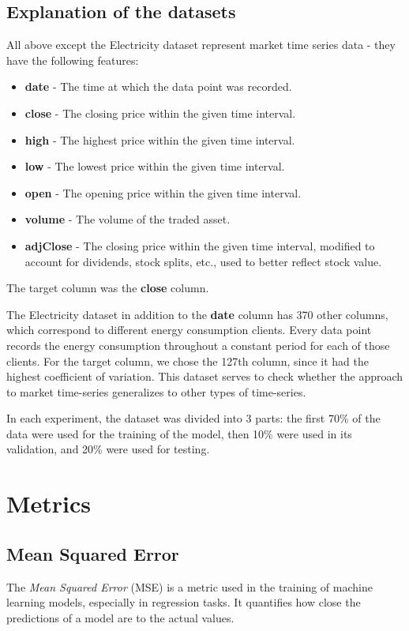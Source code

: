 \subsection{Explanation of the datasets}
All above except the Electricity dataset represent market time series data - they have the following features:
\begin{itemize}
	\item \textbf{date} - The time at which the data point was recorded.
	\item \textbf{close} - The closing price within the given time interval.
	\item \textbf{high} - The highest price within the given time interval.
	\item \textbf{low} - The lowest price within the given time interval.
	\item \textbf{open} - The opening price within the given time interval.
	\item \textbf{volume} - The volume of the traded asset.
	\item \textbf{adjClose} - The closing price within the given time interval, modified to account for dividends, stock splits, etc., used to better reflect stock value.
\end{itemize}
The target column was the \textbf{close} column.

The Electricity dataset in addition to the \textbf{date} column has 370 other columns, which correspond to different energy consumption clients. Every data point records the energy consumption throughout a constant period for each of those clients. For the target column, we chose the 127th column, since it had the highest coefficient of variation.
This dataset serves to check whether the approach to market time-series generalizes to other types of time-series.

In each experiment, the dataset was divided into 3 parts: the first 70\% of the data were used for the training of the model, then 10\% were used in its validation, and 20\% were used for testing.


\section{Metrics}

\subsection{Mean Squared Error}
The \emph{Mean Squared Error} (MSE) is a metric used in the training of machine learning models, especially in regression tasks. It quantifies how close the predictions of a model are to the actual values.

